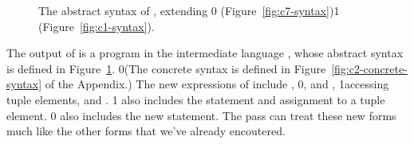 \documentclass[7x10,nocrop]{TimesAPriori_MIT}%
\newcommand{\gray}[1]{{\color{gray} #1}}
\def\racketEd{0}
\def\pythonEd{1}
\def\edition{0}
\newcommand{\racket}[1]{{\if\edition\racketEd{#1}\fi}}
\newcommand{\python}[1]{{\if\edition\pythonEd #1\fi}}
\begin{document}
\newcommand{\CtupASTPython}{
\begin{array}{lcl}
\Exp &::= & \GET{\Atm}{\Atm} \MID \ALLOCATE{\Int}{\Type} \\
      &\MID& \GLOBALVALUE{\Var} \MID \LEN{\Atm} \\
\Stmt &::=& \COLLECT{\Int} \\
     &\MID& \ASSIGN{\PUT{\Atm}{\Atm}}{\Atm} 
\end{array}
}

\begin{figure}[tp]
\fbox{
  \begin{minipage}{0.96\textwidth}
    \small
{\if\edition\racketEd    
\[
\begin{array}{l}
  \gray{\CvarASTRacket} \\ \hline
  \gray{\CifASTRacket} \\ \hline
  \gray{\CloopASTRacket} \\ \hline
  \CtupASTRacket \\
  \begin{array}{lcl}
    \LangCVecM{} & ::= & \CPROGRAM{\itm{info}}{\LP\LP\itm{label}\,\key{.}\,\Tail\RP\ldots\RP}
  \end{array}
\end{array}
\]
\fi}
{\if\edition\pythonEd
\[
\begin{array}{l}
  \gray{\CifASTPython} \\ \hline
  \CtupASTPython \\
\begin{array}{lcl}
\LangCVecM{} & ::= & \CPROGRAM{\itm{info}}{\LC\itm{label}\key{:}\,\Stmt^{*}, \ldots \RC}
\end{array}
\end{array}
\]
\fi}
\end{minipage}
}
\caption{The abstract syntax of \LangCVec{}, extending
  \racket{\LangCLoop{} (Figure~\ref{fig:c7-syntax})}\python{\LangCIf{}
  (Figure~\ref{fig:c1-syntax})}.}
\label{fig:c2-syntax}
\end{figure}

The output of  is a program in the
intermediate language \LangCVec{}, whose abstract syntax is defined in
Figure~\ref{fig:c2-syntax}.
%
\racket{(The concrete syntax is defined in
  Figure~\ref{fig:c2-concrete-syntax} of the Appendix.)}
%
The new expressions of \LangCVec{} include ,
%
\racket{, and ,}
%
\python{accessing tuple elements,}
%
and .
%
\python{\LangCVec{} also includes the  statement and
assignment to a tuple element.}
%
\racket{\LangCVec{} also includes the new \code{collect} statement.}
%
The  pass can treat these new forms much like
the other forms that we've already encoutered.
\end{document}
